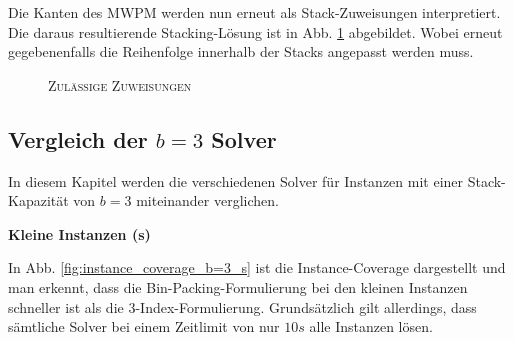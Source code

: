 Die Kanten des \textsc{MWPM} werden nun erneut als Stack-Zuweisungen interpretiert.
Die daraus resultierende Stacking-Lösung ist in Abb. \ref{fig:valid_solution} abgebildet. Wobei erneut gegebenenfalls die Reihenfolge
innerhalb der Stacks angepasst werden muss.

\begin{figure}[H]
  \centering
    \caption{\textsc{Zulässige Zuweisungen}}
    \label{fig:valid_solution}
\end{figure}

\pagebreak

\subsection{Vergleich der $b = 3$ Solver}
\label{sec:solver_comp_b=3}

In diesem Kapitel werden die verschiedenen Solver für Instanzen mit einer Stack-Kapazität von $b = 3$ miteinander verglichen.

\textbf{Kleine Instanzen (s)}

In Abb. \ref{fig:instance_coverage_b=3_s} ist die Instance-Coverage dargestellt und man erkennt, dass die Bin-Packing-Formulierung
bei den kleinen Instanzen schneller ist als die 3-Index-Formulierung. Grundsätzlich gilt allerdings, dass sämtliche Solver bei einem
Zeitlimit von nur $10s$ alle Instanzen lösen.

